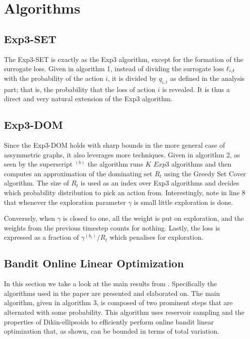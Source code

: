 \section{Algorithms}

\subsection{Exp3-SET}
The Exp3-SET is exactly as the Exp3 algorithm, except for the formation of the surrogate loss. Given in algorithm 1, instead of dividing the surrogate loss $\ell_{i,t}$ with the probability of the action $i$, it is divided by $q_{i,t}$ as defined in the analysis part; that is, the probability that the loss of action $i$ is revealed. It is thus a direct and very natural extension of the Exp3 algorithm. 

\subsection{Exp3-DOM}
Since the Exp3-DOM holds with sharp bounds in the more general case of assymmetric graphs, it also leverages more techniques. Given in algorithm 2, as seen by the superscript ${}^{(b)}$ the algorithm runs $K$ $Exp3$ algorithms and then computes an approximation of the dominating set $R_t$ using the Greedy Set Cover algorithm. The size of $R_t$ is used as an index over Exp3 algorithms and decides which probability distribution to pick an action from. Interestingly, note in line 8 that whenever the exploration parameter $\gamma$ is small little exploration is done.


\unskip

\unskip

Conversely, when $\gamma$ is closed to one, all the weight is put on exploration, and the weights from the previous timestep counts for nothing. Lastly, the loss is expressed as a fraction of $\gamma^{(b_t)}/R_t$ which penalises for exploration. 

\subsection{Bandit Online Linear Optimization}
In this section we take a look at the main results from \citep{hazan}.
Specifically  the algorithms used in the paper are presented and elaborated on.
The main algorithm, given in algorithm 3, is composed of two prominent steps that are alternated with 
some probability. This algorithm uses reservoir sampling and the 
properties of Dikin-ellipsoids to efficiently perform online bandit linear
optimization that, as shown, can be bounded in terms of total variation.

